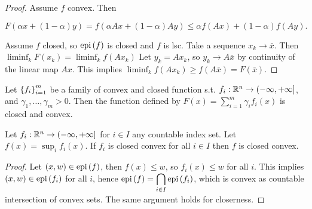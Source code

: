 \begin{proof}
    
    Assume $f$ convex. Then 

    \[ F(\alpha x + (1-\alpha)y) = f(\alpha A x + (1-\alpha) A y) \le \alpha f(Ax) + (1-\alpha) f(Ay). \]

    Assume $f$ closed, so $\mathrm{epi}\left(f\right)$ is closed and $f$ is lsc. Take a sequence $x_k \to \bar{x}$. Then $\displaystyle\liminf_k F(x_k) = \displaystyle\liminf_k f(Ax_k)$ Let $y_k = Ax_k$, so $y_k \to A\bar{x}$ by continuity of the linear map $Ax$. This implies $\displaystyle\liminf_k f(Ax_k) \ge f(A\bar{x}) = F(\bar{x})$. 

\end{proof}

\begin{proposition}

    Let $\left\{ f_i \right\}_{i=1}^m$ be a family of convex and closed function s.t. $f_i : {\mathbb{R}^n} \to (-\infty,+\infty]$, and $\gamma_1, \dots, \gamma_m > 0$. Then the function defined by $F(x) = \sum_{i=1}^m \gamma_i f_i(x)$ is closed and convex. 

\end{proposition}

\begin{proposition}[Book 1.1.6]
    
    Let $f_i : {\mathbb{R}^n} \to (-\infty,+\infty]$ for $i \in I$ any countable index set. Let $f(x) = \displaystyle\sup_i f_i(x)$. If $f_i$ is closed convex for all $i \in I$ then $f$ is closed convex.

\end{proposition}

\begin{proof}
    
    Let $(x,w) \in \mathrm{epi}\left(f\right)$, then $f(x) \le w$, so $f_i(x) \le w$ for all $i$. This implies $(x,w) \in \mathrm{epi}\left(f_i\right)$ for all $i$, hence $\mathrm{epi}\left(f\right) = \displaystyle\bigcap_{i \in I} \mathrm{epi}\left(f_i\right)$, which is convex as countable intersection of convex sets. The same argument holds for closerness. 

\end{proof}